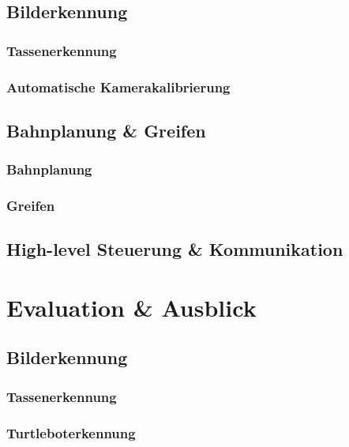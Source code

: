 \documentclass[de,ids]{fziartcl}
\begin{document}
\subsection{Bilderkennung}
\subsubsection{Tassenerkennung}
\label{4-1-1_gesamtsystem_bilderkennung_tassenerkennung}
\subsubsection{Automatische Kamerakalibrierung}
\subsection{Bahnplanung \& Greifen}
\subsubsection{Bahnplanung}
\subsubsection{Greifen}
\subsection{High-level Steuerung \& Kommunikation}

\section{Evaluation \& Ausblick} %
\subsection{Bilderkennung}
\subsubsection{Tassenerkennung}
\subsubsection{Turtleboterkennung}
\end{document}
